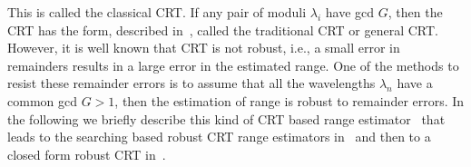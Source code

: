 This is called the classical CRT. If any pair of moduli $\lambda_i$ have gcd $G$, then the CRT has the form, described in~\cite{Oystein_Ore_general_chinese_Remainder_1952}, called the traditional CRT or general CRT.  However, it is well known that CRT is not robust, i.e., a small error in remainders results in a large error in the estimated range. One of the methods to resist these remainder errors is to assume that all the wavelengths $\lambda_n$ have a common gcd $G>1$, then the estimation of range is robust to remainder errors. In the following we briefly describe this kind of CRT based range estimator~\cite{W.Wang_closed_form_crt_2010} that leads to the searching based robust CRT range estimators in~\cite{Xia2007, Xiaowei_Li_robust_CRT_2009} and then to a closed form robust CRT in~\cite{W.Wang_closed_form_crt_2010}.

